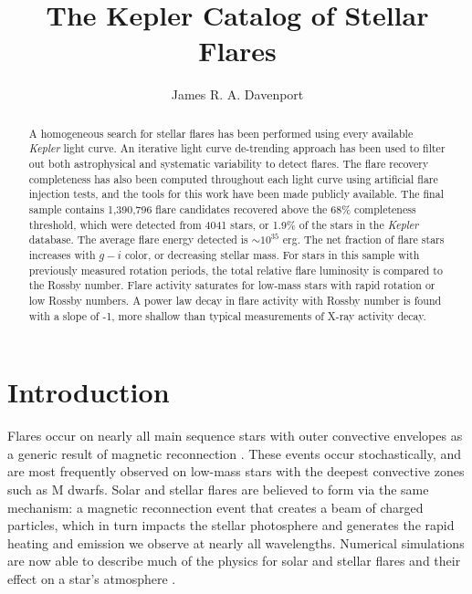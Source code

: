 \documentclass[twocolumn]{aastex6}
\newcommand{\Kepler}{\textsl{Kepler}\xspace}
\begin{document}
\title{The Kepler Catalog of Stellar Flares}


\author{
	James R. A. Davenport
	}



\begin{abstract}
A homogeneous search for stellar flares has been performed using every available \Kepler light curve. An iterative light curve de-trending approach has been used to filter out both astrophysical and systematic variability to detect flares. The flare recovery completeness has also been computed throughout each light curve using artificial flare injection tests, and the tools for this work have been made publicly available. The final sample contains 1,390,796 flare candidates recovered above the 68\% completeness threshold, which were detected from 4041 stars, or 1.9\% of the stars in the \Kepler database. The average flare energy detected is $\sim$$10^{35}$ erg. The net fraction of flare stars increases with $g-i$ color, or decreasing stellar mass. For stars in this sample with previously measured rotation periods, the total relative flare luminosity is compared to the Rossby number. Flare activity saturates for low-mass stars with rapid rotation or low Rossby numbers. A power law decay in flare activity with Rossby number is found with a slope of -1, more shallow than typical measurements of X-ray activity decay.
\end{abstract}


\section{Introduction}

Flares occur on nearly all main sequence stars with outer convective envelopes as a generic result of magnetic reconnection \citep{pettersen1989}. These events occur stochastically, and are most frequently observed on low-mass stars with the deepest convective zones such as M dwarfs. Solar and stellar flares are believed to form via the same mechanism: a magnetic reconnection event that creates a beam of charged particles, which in turn impacts the stellar photosphere and generates the rapid heating and emission we observe at nearly all wavelengths. Numerical simulations are now able to describe much of the physics for solar and stellar flares and their effect on a star's atmosphere \citep{allred2015}.
\end{document}
